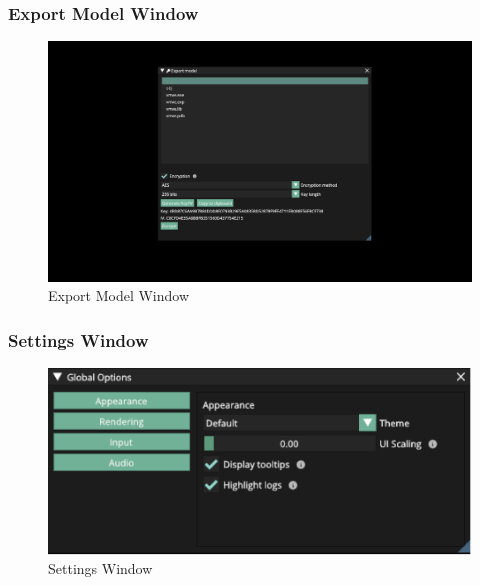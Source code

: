 \documentclass[11pt]{article}
\begin{document}
\subsubsection{Export Model Window}
\begin{figure}[H]
  \centering
  \includegraphics[width=\textwidth]{images/encryption_system.png}
  \caption{Export Model Window}
  \label{fig:encryption_window}
\end{figure}

\subsubsection{Settings Window}

\begin{figure}[H]
  \centering
  \includegraphics[width=\textwidth]{images/settings_window.png}
  \caption{Settings Window}
  \label{fig:settings_window}
\end{figure}
\end{document}
